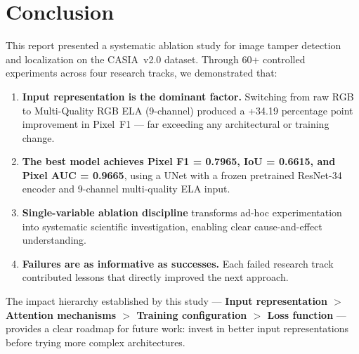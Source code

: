\documentclass[conference]{IEEEtran}
\begin{document}
\section{Conclusion}

This report presented a systematic ablation study for image tamper detection and localization on the CASIA~v2.0 dataset. Through 60+ controlled experiments across four research tracks, we demonstrated that:

\begin{enumerate}
    \item \textbf{Input representation is the dominant factor.} Switching from raw RGB to Multi-Quality RGB ELA (9-channel) produced a +34.19 percentage point improvement in Pixel~F1 --- far exceeding any architectural or training change.
    \item \textbf{The best model achieves Pixel F1 = 0.7965, IoU = 0.6615, and Pixel AUC = 0.9665}, using a UNet with a frozen pretrained ResNet-34 encoder and 9-channel multi-quality ELA input.
    \item \textbf{Single-variable ablation discipline} transforms ad-hoc experimentation into systematic scientific investigation, enabling clear cause-and-effect understanding.
    \item \textbf{Failures are as informative as successes.} Each failed research track contributed lessons that directly improved the next approach.
\end{enumerate}

The impact hierarchy established by this study --- \textbf{Input representation $>$ Attention mechanisms $>$ Training configuration $>$ Loss function} --- provides a clear roadmap for future work: invest in better input representations before trying more complex architectures.
\end{document}

